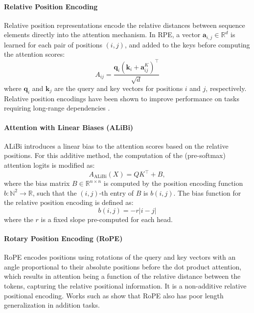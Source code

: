 \paragraph{Relative Position Encoding}\label{subsec:relative_pos_enc}
Relative position representations \parencite{shaw_self-attention_2018} encode the relative distances between sequence elements directly into the attention mechanism. In RPE, a vector $\mathbf{a}_{i, j} \in \mathbb{R}^d$ is learned for each pair of positions $(i, j)$, and added to the keys before computing the attention scores:
\begin{equation*}
    A_{ij} = \frac{\mathbf{q}_i (\mathbf{k}_i + \mathbf{a}_{ij}^K)^\top}{\sqrt{d}}
\end{equation*}
where $\mathbf{q}_i$ and $\mathbf{k}_j$ are the query and key vectors for positions $i$ and $j$, respectively. Relative position encodings have been shown to improve performance on tasks requiring long-range dependencies \parencite{shaw_self-attention_2018}.

\paragraph{Attention with Linear Biases (ALiBi)}\label{subsec:alibi}
ALiBi \parencite{press_train_2021} introduces a linear bias to the attention scores based on the relative positions. For this additive method, the computation of the (pre-softmax) attention logits is modified as:
\begin{equation*}
    A_{\text{ALiBi}}(X) = Q K^\top + B,
\end{equation*}
where the bias matrix $B \in \mathbb{R}^{n \times n}$ is computed by the position encoding function $b : \mathbb{N}^2 \to \mathbb{R}$, such that the $(i,j)$-th entry of $B$ is $b(i,j)$. The bias function for the relative position encoding is defined as:
\begin{equation*}
    b(i,j) = -r|i - j|
\end{equation*}
where the $r$ is a fixed slope pre-computed for each head.

\paragraph{Rotary Position Encoding (RoPE)}\label{subsec:rope}
RoPE \cite{su_roformer_2024} encodes positions using rotations of the query and key vectors with an angle proportional to their absolute positions before the dot product attention, which results in attention being a function of the relative distance between the tokens, capturing the relative positional information. It is a non-additive relative positional encoding. Works such as \cite{press_train_2021,kazemnejad_impact_2023} show that RoPE also has poor length generalization in addition tasks.

